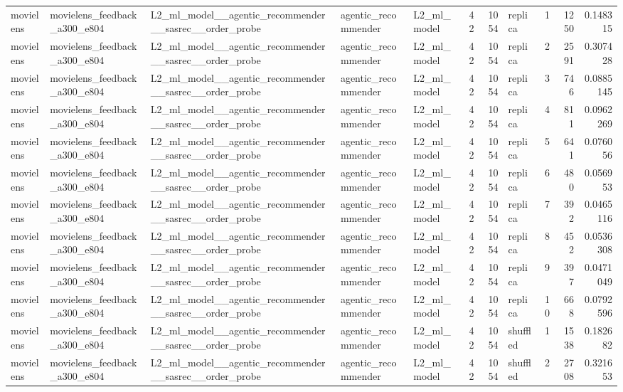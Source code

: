 \begin{table}[htbp!]
\begin{tabular}{lllllrrlrrr}
movielens & movielens\_feedback\_a300\_e804 & L2\_ml\_model\_\_agentic\_recommender\_\_sasrec\_\_order\_probe & agentic\_recommender & L2\_ml\_model & 42 & 1054 & replica & 1 & 1250 & 0.148315 \\
movielens & movielens\_feedback\_a300\_e804 & L2\_ml\_model\_\_agentic\_recommender\_\_sasrec\_\_order\_probe & agentic\_recommender & L2\_ml\_model & 42 & 1054 & replica & 2 & 2591 & 0.307428 \\
movielens & movielens\_feedback\_a300\_e804 & L2\_ml\_model\_\_agentic\_recommender\_\_sasrec\_\_order\_probe & agentic\_recommender & L2\_ml\_model & 42 & 1054 & replica & 3 & 746 & 0.0885145 \\
movielens & movielens\_feedback\_a300\_e804 & L2\_ml\_model\_\_agentic\_recommender\_\_sasrec\_\_order\_probe & agentic\_recommender & L2\_ml\_model & 42 & 1054 & replica & 4 & 811 & 0.0962269 \\
movielens & movielens\_feedback\_a300\_e804 & L2\_ml\_model\_\_agentic\_recommender\_\_sasrec\_\_order\_probe & agentic\_recommender & L2\_ml\_model & 42 & 1054 & replica & 5 & 641 & 0.076056 \\
movielens & movielens\_feedback\_a300\_e804 & L2\_ml\_model\_\_agentic\_recommender\_\_sasrec\_\_order\_probe & agentic\_recommender & L2\_ml\_model & 42 & 1054 & replica & 6 & 480 & 0.056953 \\
movielens & movielens\_feedback\_a300\_e804 & L2\_ml\_model\_\_agentic\_recommender\_\_sasrec\_\_order\_probe & agentic\_recommender & L2\_ml\_model & 42 & 1054 & replica & 7 & 392 & 0.0465116 \\
movielens & movielens\_feedback\_a300\_e804 & L2\_ml\_model\_\_agentic\_recommender\_\_sasrec\_\_order\_probe & agentic\_recommender & L2\_ml\_model & 42 & 1054 & replica & 8 & 452 & 0.0536308 \\
movielens & movielens\_feedback\_a300\_e804 & L2\_ml\_model\_\_agentic\_recommender\_\_sasrec\_\_order\_probe & agentic\_recommender & L2\_ml\_model & 42 & 1054 & replica & 9 & 397 & 0.0471049 \\
movielens & movielens\_feedback\_a300\_e804 & L2\_ml\_model\_\_agentic\_recommender\_\_sasrec\_\_order\_probe & agentic\_recommender & L2\_ml\_model & 42 & 1054 & replica & 10 & 668 & 0.0792596 \\
movielens & movielens\_feedback\_a300\_e804 & L2\_ml\_model\_\_agentic\_recommender\_\_sasrec\_\_order\_probe & agentic\_recommender & L2\_ml\_model & 42 & 1054 & shuffled & 1 & 1538 & 0.182682 \\
movielens & movielens\_feedback\_a300\_e804 & L2\_ml\_model\_\_agentic\_recommender\_\_sasrec\_\_order\_probe & agentic\_recommender & L2\_ml\_model & 42 & 1054 & shuffled & 2 & 2708 & 0.321653 \\

\end{tabular}
\end{table}
